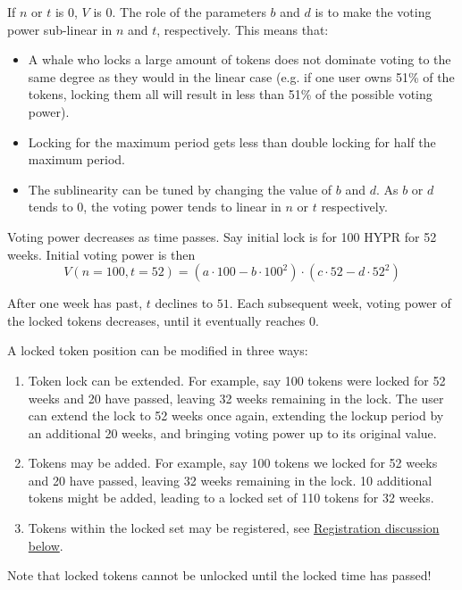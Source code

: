 \documentclass{article}
\begin{document}
If $n$ or $t$ is $0$, $V$ is $0$.
The role of the parameters $b$ and $d$ is to make the voting power sub-linear in $n$ and $t$, respectively.
This means that:
\begin{itemize}
    \item A whale who locks a large amount of tokens does not dominate voting to the same degree as they would in the linear case (e.g. if one user owns 51\% of the tokens, locking them all will result in less than 51\% of the possible voting power).
    \item Locking for the maximum period gets less than double locking for half the maximum period.
    \item The sublinearity can be tuned by changing the value of $b$ and $d$.
      As $b$ or $d$ tends to $0$, the voting power tends to linear in $n$ or $t$ respectively.
\end{itemize}

Voting power decreases as time passes.
Say initial lock is for 100 HYPR for 52 weeks.
Initial voting power is then
\begin{equation}
V(n=100, t=52) = (a\cdot 100 - b\cdot 100^2) \cdot (c\cdot 52 - d\cdot 52^2)
\end{equation}

After one week has past, $t$ declines to $51$.
Each subsequent week, voting power of the locked tokens decreases, until it eventually reaches $0$.

A locked token position can be modified in three ways:
\begin{enumerate}
    \item Token lock can be extended.
       For example, say 100 tokens were locked for 52 weeks and 20 have passed, leaving 32 weeks remaining in the lock.
       The user can extend the lock to 52 weeks once again, extending the lockup period by an additional 20 weeks, and bringing voting power up to its original value.
    \item Tokens may be added.
       For example, say 100 tokens we locked for 52 weeks and 20 have passed, leaving 32 weeks remaining in the lock.
       10 additional tokens might be added, leading to a locked set of 110 tokens for 32 weeks.
    \item Tokens within the locked set may be registered, see \hyperref[sec:registration]{Registration discussion below}.
\end{enumerate}

Note that locked tokens cannot be unlocked until the locked time has passed!
\end{document}

